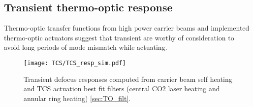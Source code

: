 \subsection{Transient thermo-optic response}
Thermo-optic transfer functions from high power carrier beams and implemented thermo-optic actuators suggest that transient are worthy of consideration to avoid long periods of mode mismatch while actuating.
\begin{figure}[H]
  \centering
  \begin{subcaptiongroup}
	  \texttt{[image: TCS/TCS\_resp\_sim.pdf]}
	  \label{TO_response}
  \end{subcaptiongroup}
  \captionsetup{subrefformat=parens}
  \hfill
  \caption{Transient defocus responses computed from carrier beam self heating and TCS actuation best fit filters (central CO2 laser heating and annular ring heating) \autoref{sec:TO_filt}.} 
\label{fig:thermooptic_response}
\end{figure}

